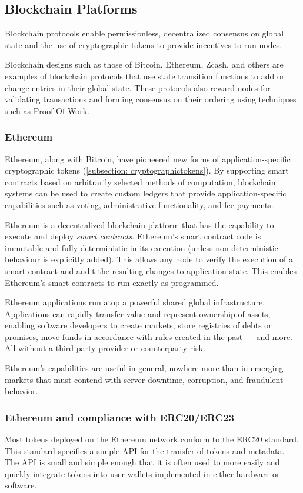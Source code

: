 \subsection{Blockchain Platforms}
Blockchain protocols enable permissionless, decentralized consensus on global state and the use of cryptographic tokens to provide incentives to run nodes. 

Blockchain designs such as those of Bitcoin, Ethereum, Zcash, and others are examples of blockchain protocols that use state transition functions to add or change entries in their global state. These protocols also reward nodes for validating transactions and forming consensus on their ordering using techniques such as Proof-Of-Work\cite{44}.

\subsubsection{Ethereum}
Ethereum\cite{31}, along with Bitcoin, have pioneered new forms of application-specific cryptographic tokens (\ref{subsection: cryptographictokens}). By supporting smart contracts based on arbitrarily selected methods of computation, blockchain systems can be used to create custom ledgers that provide application-specific capabilities such as voting, administrative functionality, and fee payments.

Ethereum\cite{29} is a decentralized blockchain platform that has the capability to execute and deploy \textit{smart contracts}. Ethereum's smart contract code is immutable and fully deterministic in its execution (unless non-deterministic behaviour is explicitly added). This allows any node to verify the execution of a smart contract and audit the resulting changes to application state. This enables Ethereum's smart contracts to run exactly as programmed.

Ethereum applications run atop a powerful shared global infrastructure. Applications can rapidly transfer value and represent ownership of assets, enabling software developers to create markets, store registries of debts or promises, move funds in accordance with rules created in the past — and more. All without a third party provider or counterparty risk.

Ethereum's capabilities are useful in general, nowhere more than in emerging markets that must contend with server downtime, corruption, and fraudulent behavior.

\subsubsection{Ethereum and \tOM{} compliance with ERC20/ERC23}
Most tokens deployed on the Ethereum network conform to the ERC20 standard\cite{38}. This standard specifies a simple API for the transfer of tokens and metadata. The API is small and simple enough that it is often used to more easily and quickly integrate tokens into user wallets implemented in either hardware or software.

